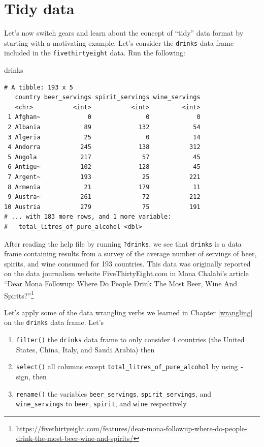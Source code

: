 \documentclass[12pt, krantz2,]{krantz}
\makeatletter
\newenvironment{Shaded}{\begin{snugshade}}{\end{snugshade}}
\newcommand{\NormalTok}[1]{#1}
\providecommand{\tightlist}{%
  \setlength{\itemsep}{0pt}\setlength{\parskip}{0pt}}
\renewcommand{\href}[2]{#2\footnote{\url{#1}}}
\newenvironment{kframe}{%
\medskip{}
\setlength{\fboxsep}{.8em}
 \def\at@end@of@kframe{}%
 \ifinner\ifhmode%
  \def\at@end@of@kframe{\end{minipage}}%
  \begin{minipage}{\columnwidth}%
 \fi\fi%
 \def\FrameCommand##1{\hskip\@totalleftmargin \hskip-\fboxsep
 \colorbox{shadecolor}{##1}\hskip-\fboxsep
     \hskip-\linewidth \hskip-\@totalleftmargin \hskip\columnwidth}%
 \MakeFramed {\advance\hsize-\width
   \@totalleftmargin\z@ \linewidth\hsize
   \@setminipage}}%
 {\par\unskip\endMakeFramed%
 \at@end@of@kframe}
\renewenvironment{Shaded}{\begin{kframe}}{\end{kframe}}
\makeatother
\begin{document}
\hypertarget{tidy-data-ex}{%
\section{Tidy data}\label{tidy-data-ex}}

Let's now switch gears and learn about the concept of ``tidy'' data format by starting with a motivating example. Let's consider the \texttt{drinks} data frame included in the \texttt{fivethirtyeight} data. Run the following:

\begin{Shaded}
\begin{Highlighting}[]
\NormalTok{drinks}
\end{Highlighting}
\end{Shaded}

\begin{verbatim}
# A tibble: 193 x 5
   country beer_servings spirit_servings wine_servings
   <chr>           <int>           <int>         <int>
 1 Afghan~             0               0             0
 2 Albania            89             132            54
 3 Algeria            25               0            14
 4 Andorra           245             138           312
 5 Angola            217              57            45
 6 Antigu~           102             128            45
 7 Argent~           193              25           221
 8 Armenia            21             179            11
 9 Austra~           261              72           212
10 Austria           279              75           191
# ... with 183 more rows, and 1 more variable:
#   total_litres_of_pure_alcohol <dbl>
\end{verbatim}

After reading the help file by running \texttt{?drinks}, we see that \texttt{drinks} is a data frame containing results from a survey of the average number of servings of beer, spirits, and wine consumed for 193 countries. This data was originally reported on the data journalism website FiveThirtyEight.com in Mona Chalabi's article \href{https://fivethirtyeight.com/features/dear-mona-followup-where-do-people-drink-the-most-beer-wine-and-spirits/}{``Dear Mona Followup: Where Do People Drink The Most Beer, Wine And Spirits?''}

Let's apply some of the data wrangling verbs we learned in Chapter \ref{wrangling} on the \texttt{drinks} data frame. Let's

\begin{enumerate}
\def\labelenumi{\arabic{enumi}.}
\tightlist
\item
  \texttt{filter()} the \texttt{drinks} data frame to only consider 4 countries (the United States, China, Italy, and Saudi Arabia) then
\item
  \texttt{select()} all columns except \texttt{total\_litres\_of\_pure\_alcohol} by using \texttt{-} sign, then
\item
  \texttt{rename()} the variables \texttt{beer\_servings}, \texttt{spirit\_servings}, and \texttt{wine\_servings} to \texttt{beer}, \texttt{spirit}, and \texttt{wine} respectively
\end{enumerate}
\end{document}
